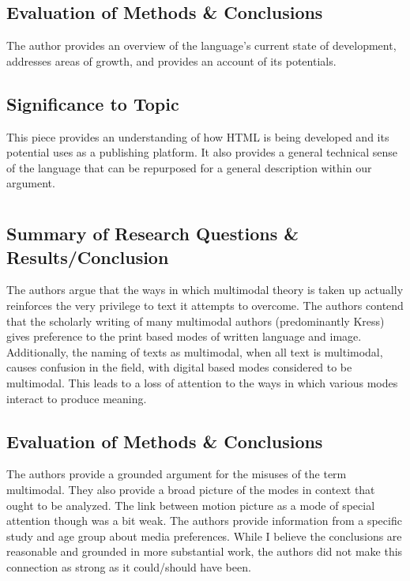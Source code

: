 \documentclass[leavefloats]{apa6e}\usepackage[]{graphicx}\usepackage[]{color}
\begin{document}
\subsection{Evaluation of Methods \& Conclusions} %
The author provides an overview of the language's current state of development, addresses areas of growth, and provides an account of its potentials.

\subsection{Significance to Topic} %
This piece provides an understanding of how HTML is being developed and its potential uses as a publishing platform.  It also provides a general technical sense of the language that can be repurposed for a general description within our argument.


 \section{\textcite{Bazalgette2013}}





\regpar



\subsection{Summary of Research Questions \& Results/Conclusion} %
The authors argue that the ways in which multimodal theory is taken up actually reinforces the very privilege to text it attempts to overcome.  The authors contend that the scholarly writing of many multimodal authors (predominantly Kress) gives preference to the print based modes of written language and image.  Additionally, the naming of texts as multimodal, when all text is multimodal, causes confusion in the field, with digital based modes considered to be multimodal.  This leads to a loss of attention to the ways in which various modes interact to produce meaning.

\subsection{Evaluation of Methods \& Conclusions} %
The authors provide a grounded argument for the misuses of the term multimodal.  They also provide a broad picture of the modes in context that ought to be analyzed.  The link between motion picture as a mode of special attention though was a bit weak.  The authors provide information from a specific study and age group about media preferences.  While I believe the conclusions are reasonable and grounded in more substantial work, the authors did not make this connection as strong as it could/should have been. 
\end{document}
